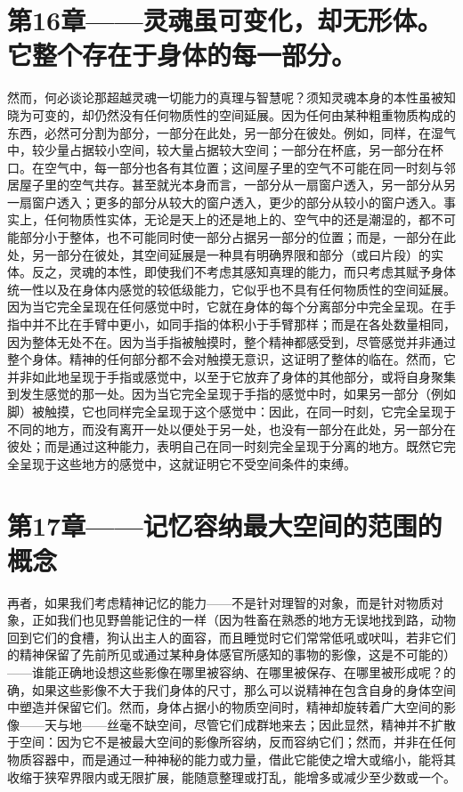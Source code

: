 
\section{第16章——灵魂虽可变化，却无形体。它整个存在于身体的每一部分。}

然而，何必谈论那超越灵魂一切能力的真理与智慧呢？须知灵魂本身的本性虽被知晓为可变的，却仍然没有任何物质性的空间延展。因为任何由某种粗重物质构成的东西，必然可分割为部分，一部分在此处，另一部分在彼处。例如，同样，在湿气中，较少量占据较小空间，较大量占据较大空间；一部分在杯底，另一部分在杯口。在空气中，每一部分也各有其位置；这间屋子里的空气不可能在同一时刻与邻居屋子里的空气共存。甚至就光本身而言，一部分从一扇窗户透入，另一部分从另一扇窗户透入；更多的部分从较大的窗户透入，更少的部分从较小的窗户透入。事实上，任何物质性实体，无论是天上的还是地上的、空气中的还是潮湿的，都不可能部分小于整体，也不可能同时使一部分占据另一部分的位置；而是，一部分在此处，另一部分在彼处，其空间延展是一种具有明确界限和部分（或曰片段）的实体。反之，灵魂的本性，即使我们不考虑其感知真理的能力，而只考虑其赋予身体统一性以及在身体内感觉的较低级能力，它似乎也不具有任何物质性的空间延展。因为当它完全呈现在任何感觉中时，它就在身体的每个分离部分中完全呈现。在手指中并不比在手臂中更小，如同手指的体积小于手臂那样；而是在各处数量相同，因为整体无处不在。因为当手指被触摸时，整个精神都感受到，尽管感觉并非通过整个身体。精神的任何部分都不会对触摸无意识，这证明了整体的临在。然而，它并非如此地呈现于手指或感觉中，以至于它放弃了身体的其他部分，或将自身聚集到发生感觉的那一处。因为当它完全呈现于手指的感觉中时，如果另一部分（例如脚）被触摸，它也同样完全呈现于这个感觉中：因此，在同一时刻，它完全呈现于不同的地方，而没有离开一处以便处于另一处，也没有一部分在此处，另一部分在彼处；而是通过这种能力，表明自己在同一时刻完全呈现于分离的地方。既然它完全呈现于这些地方的感觉中，这就证明它不受空间条件的束缚。\par


\section{第17章——记忆容纳最大空间的范围的概念}

再者，如果我们考虑精神记忆的能力——不是针对理智的对象，而是针对物质对象，正如我们也见野兽能记住的一样（因为牲畜在熟悉的地方无误地找到路，动物回到它们的食槽，狗认出主人的面容，而且睡觉时它们常常低吼或吠叫，若非它们的精神保留了先前所见或通过某种身体感官所感知的事物的影像，这是不可能的）——谁能正确地设想这些影像在哪里被容纳、在哪里被保存、在哪里被形成呢？的确，如果这些影像不大于我们身体的尺寸，那么可以说精神在包含自身的身体空间中塑造并保留它们。然而，身体占据小的物质空间时，精神却旋转着广大空间的影像——天与地——丝毫不缺空间，尽管它们成群地来去；因此显然，精神并不扩散于空间：因为它不是被最大空间的影像所容纳，反而容纳它们；然而，并非在任何物质容器中，而是通过一种神秘的能力或力量，借此它能使之增大或缩小，能将其收缩于狭窄界限内或无限扩展，能随意整理或打乱，能增多或减少至少数或一个。\par

